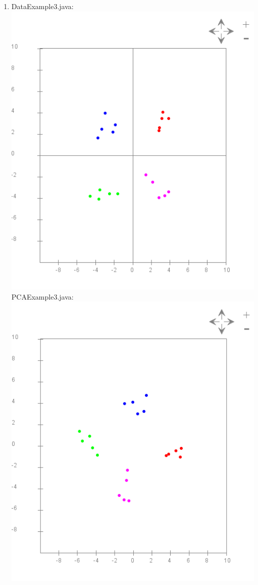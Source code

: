\documentclass{article}
\begin{document}
\begin{enumerate}
\item DataExample3.java:\\
\includegraphics[scale=0.45]{exercise24_1}\\
PCAExample3.java:\\
\includegraphics[scale=0.45]{exercise24_2}


\end{enumerate}
\end{document}
